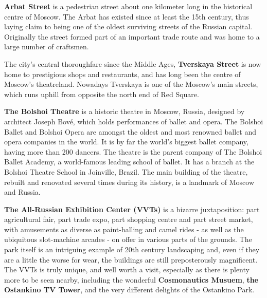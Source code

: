 \documentclass[10pt,fleqn,openany]{book} %
\begin{document}
	
	\textbf{Arbat Street} is a pedestrian street about one kilometer long in the historical centre of Moscow. The Arbat has existed since at least the 15th century, thus laying claim to being one of the oldest surviving streets of the Russian capital. Originally the street formed part of an important trade route and was home to a large number of craftsmen.
	
	
	The city's central thoroughfare since the Middle Ages, \textbf{Tverskaya Street}  is now home to prestigious shops and restaurants, and has long been the centre of Moscow's theatreland. Nowadays Tverskaya is one of the Moscow's main streets, which runs uphill from opposite the north end of Red Square.
	
	
	\textbf{The Bolshoi Theatre} is a historic theatre in Moscow, Russia, designed by architect Joseph Bové, which holds performances of ballet and opera. 
	The Bolshoi Ballet and Bolshoi Opera are amongst the oldest and most renowned ballet and opera companies in the world. It is by far the world's biggest ballet company, having more than 200 dancers. The theatre is the parent company of The Bolshoi Ballet Academy, a world-famous leading school of ballet. It has a branch at the Bolshoi Theatre School in Joinville, Brazil. 
	The main building of the theatre, rebuilt and renovated several times during its history, is a landmark of Moscow and Russia.
	
	
	\textbf{The All-Russian Exhibition Center (VVTs)} is a bizarre juxtaposition: part agricultural fair, part trade expo, part shopping centre and part street market, with amusements as diverse as paint-balling and camel rides - as well as the ubiquitous slot-machine arcades - on offer in various parts of the grounds. The park itself is an intriguing example of 20th century landscaping and, even if they are a little the worse for wear, the buildings are still preposterously magnificent. The VVTs is truly unique, and well worth a visit, especially as there is plenty more to be seen nearby, including the wonderful \textbf{Cosmonautics Musuem}, \textbf{the Ostankino TV Tower}, and the very different delights of the Ostankino Park.
	
	
\end{document}
